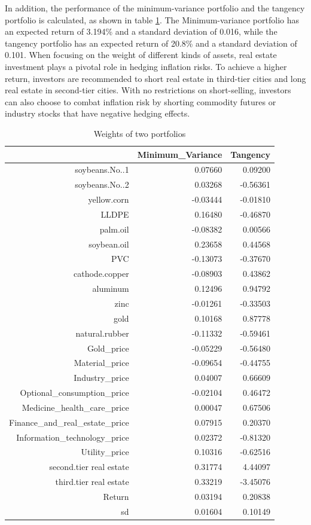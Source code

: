 \documentclass[12pt]{article}
\begin{document}
In addition, the performance of the minimum-variance portfolio and the tangency portfolio is calculated, as shown in table \ref{portfolio}. The Minimum-variance portfolio has an expected return of 3.194\% and a standard deviation of 0.016, while the tangency portfolio has an expected return of 20.8\% and a standard deviation of 0.101. When focusing on the weight of different kinds of assets, real estate investment plays a pivotal role in hedging inflation risks. To achieve a higher return, investors are recommended to short real estate in third-tier cities and long real estate in second-tier cities. With no restrictions on short-selling, investors can also choose to combat inflation risk by shorting commodity futures or industry stocks that have negative hedging effects.

\begin{table}[ht]
\centering
\caption{Weights of two portfolios} 
\label{portfolio}
\begin{tabular}{rrr}
  \hline
 & Minimum\_Variance & Tangency \\ 
  \hline
soybeans.No..1 & 0.07660 & 0.09200 \\ 
  soybeans.No..2 & 0.03268 & -0.56361 \\ 
  yellow.corn & -0.03444 & -0.01810 \\ 
  LLDPE & 0.16480 & -0.46870 \\ 
  palm.oil & -0.08382 & 0.00566 \\ 
  soybean.oil & 0.23658 & 0.44568 \\ 
  PVC & -0.13073 & -0.37670 \\ 
  cathode.copper & -0.08903 & 0.43862 \\ 
  aluminum & 0.12496 & 0.94792 \\ 
  zinc & -0.01261 & -0.33503 \\ 
  gold & 0.10168 & 0.87778 \\ 
  natural.rubber & -0.11332 & -0.59461 \\ 
  Gold\_price & -0.05229 & -0.56480 \\ 
  Material\_price & -0.09654 & -0.44755 \\ 
  Industry\_price & 0.04007 & 0.66609 \\ 
  Optional\_consumption\_price & -0.02104 & 0.46472 \\ 
  Medicine\_health\_care\_price & 0.00047 & 0.67506 \\ 
  Finance\_and\_real\_estate\_price & 0.07915 & 0.20370 \\ 
  Information\_technology\_price & 0.02372 & -0.81320 \\ 
  Utility\_price & 0.10316 & -0.62516 \\ 
  second.tier real estate & 0.31774 & 4.44097 \\ 
  third.tier real estate & 0.33219 & -3.45076 \\ 
   \hline
  Return & 0.03194 & 0.20838 \\ 
  sd & 0.01604 & 0.10149 \\ 
   \hline
\end{tabular}
\end{table}
\end{document}
